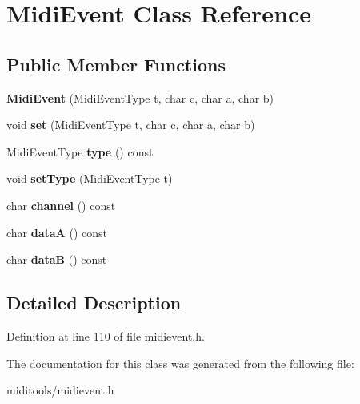 \hypertarget{class_midi_event}{}\section{Midi\+Event Class Reference}
\label{class_midi_event}
\subsection*{Public Member Functions}
\begin{DoxyCompactItemize}
\item 
\mbox{\label{class_midi_event_a8285b3e49cddeea49a78043bcfd82ead}} 
{\bfseries Midi\+Event} (Midi\+Event\+Type t, char c, char a, char b)
\item 
\mbox{\label{class_midi_event_a9aba0b60ffe6a90428eae16952175d92}} 
void {\bfseries set} (Midi\+Event\+Type t, char c, char a, char b)
\item 
\mbox{\label{class_midi_event_a647e6d1ae80cbfc5d3cd45d82d73c60d}} 
Midi\+Event\+Type {\bfseries type} () const
\item 
\mbox{\label{class_midi_event_a5a534fea7327ac10e216408409f13ec0}} 
void {\bfseries set\+Type} (Midi\+Event\+Type t)
\item 
\mbox{\label{class_midi_event_a6c2ce890c81a8dcc538dc24d931366e8}} 
char {\bfseries channel} () const
\item 
\mbox{\label{class_midi_event_a4d79374afccc4ddc846dfa1d983a89cf}} 
char {\bfseries dataA} () const
\item 
\mbox{\label{class_midi_event_ab2aa25c520b94d5f07d1eb5f6cd91596}} 
char {\bfseries dataB} () const
\end{DoxyCompactItemize}


\subsection{Detailed Description}


Definition at line 110 of file midievent.\+h.



The documentation for this class was generated from the following file\+:\begin{DoxyCompactItemize}
\item 
miditools/midievent.\+h\end{DoxyCompactItemize}
